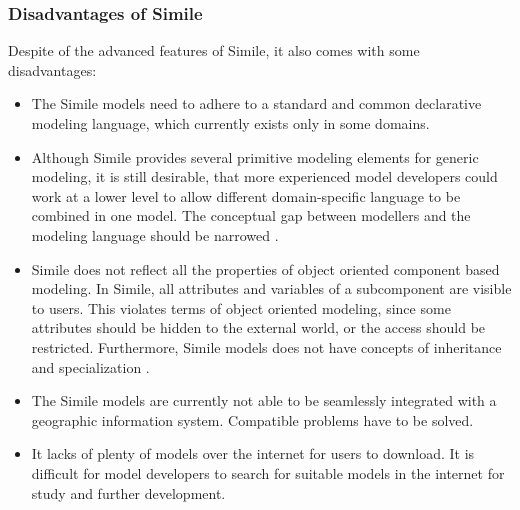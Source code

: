 \subsubsection{Disadvantages of Simile}
\par
Despite of the advanced features of Simile, it also comes with some disadvantages:
\begin{itemize}
\item 
The Simile models need to adhere to a standard and common declarative modeling language, which currently exists only in some domains.
\item
Although Simile provides several primitive modeling elements for generic modeling, it is still desirable, that more experienced model developers could work at a lower level to allow different domain-specific language to be combined in one model. The conceptual gap between modellers and the modeling language should be narrowed \autocite{dsl:simile-muetzelfeldt}.
\item
Simile does not reflect all the properties of object oriented component based modeling.  In Simile, all attributes and variables of a subcomponent are visible to users. This violates terms of object oriented modeling, since some attributes should be hidden to the external world, or the access should be restricted. Furthermore, Simile models does not have concepts of inheritance and specialization \autocite{dsl:simile-muetzelfeldt}.
\item
The Simile models are currently not able to be seamlessly integrated with a geographic information system.  Compatible problems have to be solved.
\item 
It lacks of plenty of models over the internet for users to download. It is difficult for model developers to search for suitable models in the internet for study and further development.
\end{itemize}





















